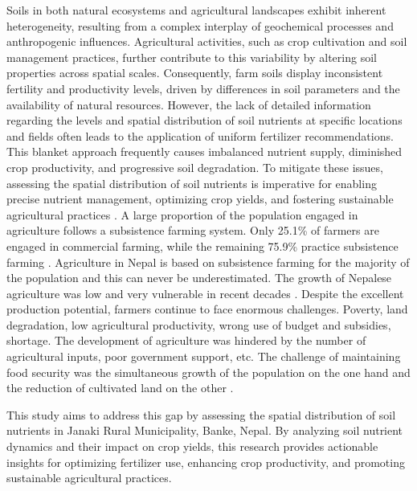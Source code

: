 Soils in both natural ecosystems and agricultural landscapes exhibit inherent heterogeneity, resulting from a complex interplay of geochemical processes and anthropogenic influences. Agricultural activities, such as crop cultivation and soil management practices, further contribute to this variability by altering soil properties across spatial scales. Consequently, farm soils display inconsistent fertility and productivity levels, driven by differences in soil parameters and the availability of natural resources. However, the lack of detailed information regarding the levels and spatial distribution of soil nutrients at specific locations and fields often leads to the application of uniform fertilizer recommendations. This blanket approach frequently causes imbalanced nutrient supply, diminished crop productivity, and progressive soil degradation. To mitigate these issues, assessing the spatial distribution of soil nutrients is imperative for enabling precise nutrient management, optimizing crop yields, and fostering sustainable agricultural practices \parencite{dahalNewApproachMeasure2024a}.
A large proportion of the population engaged in agriculture follows a subsistence farming system. Only 25.1\% of farmers are engaged in commercial farming, while the remaining 75.9\% practice subsistence farming \parencite{simkhadaReviewNepalsIncreasing2019}. Agriculture in Nepal is based on subsistence farming for the majority of the population and this can never be underestimated. The growth of Nepalese agriculture was low and very vulnerable in recent decades  \parencite{gyawaliOverviewAgricultureNepal2021}. Despite the excellent production potential, farmers continue to face enormous challenges. Poverty, land degradation, low agricultural productivity, wrong use of budget and subsidies, shortage. The development of agriculture was hindered by the number of agricultural inputs, poor government support, etc. The challenge of maintaining food security was the simultaneous growth of the population on the one hand and the reduction of cultivated land on the other \parencite{gyawaliOverviewAgricultureNepal2021}.

This study aims to address this gap by assessing the spatial distribution of soil nutrients in Janaki Rural Municipality, Banke, Nepal. By analyzing soil nutrient dynamics and their impact on crop yields, this research provides actionable insights for optimizing fertilizer use, enhancing crop productivity, and promoting sustainable agricultural practices.


